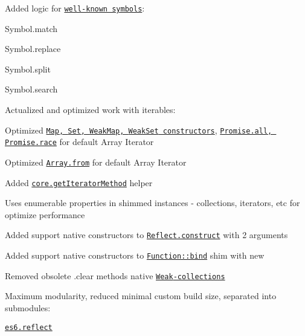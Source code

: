 \begin{DoxyItemize}
\item Added logic for \href{https://github.com/zloirock/core-js/#ecmascript-6-regexp}{\tt well-\/known symbols}\+:
\begin{DoxyItemize}
\item {\ttfamily Symbol.\+match}
\item {\ttfamily Symbol.\+replace}
\item {\ttfamily Symbol.\+split}
\item {\ttfamily Symbol.\+search}
\end{DoxyItemize}
\item Actualized and optimized work with iterables\+:
\begin{DoxyItemize}
\item Optimized \href{https://github.com/zloirock/core-js/#ecmascript-6-collections}{\tt {\ttfamily Map}, {\ttfamily Set}, {\ttfamily Weak\+Map}, {\ttfamily Weak\+Set} constructors}, \href{https://github.com/zloirock/core-js/#ecmascript-6-promise}{\tt {\ttfamily Promise.\+all}, {\ttfamily Promise.\+race}} for default {\ttfamily Array Iterator}
\item Optimized \href{https://github.com/zloirock/core-js/#ecmascript-6-array}{\tt {\ttfamily Array.\+from}} for default {\ttfamily Array Iterator}
\item Added \href{https://github.com/zloirock/core-js/#ecmascript-6-iterators}{\tt {\ttfamily core.\+get\+Iterator\+Method}} helper
\end{DoxyItemize}
\item Uses enumerable properties in shimmed instances -\/ collections, iterators, etc for optimize performance
\item Added support native constructors to \href{https://github.com/zloirock/core-js/#ecmascript-6-reflect}{\tt {\ttfamily Reflect.\+construct}} with 2 arguments
\item Added support native constructors to \href{https://github.com/zloirock/core-js/#ecmascript-5}{\tt {\ttfamily Function\+::bind}} shim with {\ttfamily new}
\item Removed obsolete {\ttfamily .clear} methods native \href{https://github.com/zloirock/core-js/#ecmascript-6-collections}{\tt {\ttfamily Weak}-\/collections}
\item Maximum modularity, reduced minimal custom build size, separated into submodules\+:
\begin{DoxyItemize}
\item \href{https://github.com/zloirock/core-js/#ecmascript-6-reflect}{\tt {\ttfamily es6.\+reflect}}

\end{DoxyItemize}
\end{DoxyItemize}
